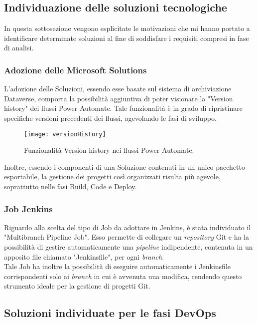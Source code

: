 \subsection{Individuazione delle soluzioni tecnologiche}
In questa sottosezione vengono esplicitate le motivazioni che mi hanno portato a identificare determinate soluzioni al fine di soddisfare i requisiti compresi in fase di analisi.

\subsubsection*{Adozione delle Microsoft Solutions}
\label{progettazioneSolutions}
L'adozione delle Soluzioni, essendo esse basate sul sistema di archiviazione Dataverse, comporta la possibilità aggiuntiva di poter visionare la "Version history" dei flussi Power Automate. Tale funzionalità è in grado di ripristinare specifiche versioni precedenti dei flussi, agevolando le fasi di sviluppo.
\begin{figure}[htbp] 
    \centering 
    \texttt{[image: versionHistory]} 
    \caption{Funzionalità Version history nei flussi Power Automate.}
    \label{fig:versionHistory}
\end{figure}
\newline \noindent Inoltre, essendo i componenti di una Soluzione contenuti in un unico pacchetto esportabile, la gestione dei progetti così organizzati risulta più agevole, soprattutto nelle fasi Build, Code e Deploy. 

\subsubsection*{Job Jenkins}
Riguardo alla scelta del tipo di Job da adottare in Jenkins, è stata individuato il "Multibranch Pipeline Job". Esso permette di collegare un \emph{repository} Git e ha la possibilità di gestire automaticamente una \emph{pipeline} indipendente, contenuta in un apposito file chiamato "Jenkinsfile", per ogni \emph{branch}.\\
Tale Job ha inoltre la possibilità di eseguire automaticamente i Jenkinsfile corrispondenti solo ai \emph{branch} in cui è avvenuta una modifica, rendendo questo strumento ideale per la gestione di progetti Git.\\

\subsection{Soluzioni individuate per le fasi DevOps}
